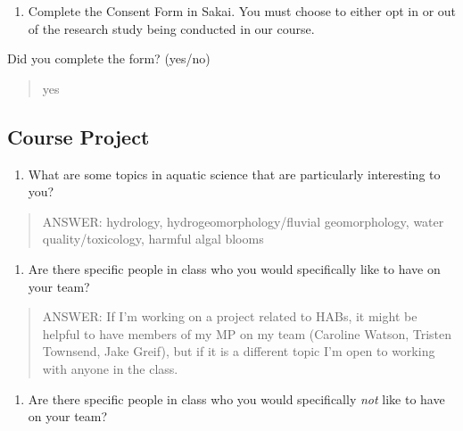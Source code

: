 \documentclass[]{article}
\providecommand{\tightlist}{%
  \setlength{\itemsep}{0pt}\setlength{\parskip}{0pt}}
\begin{document}
\begin{enumerate}
\def\labelenumi{\arabic{enumi}.}
\setcounter{enumi}{1}
\tightlist
\item
  Complete the Consent Form in Sakai. You must choose to either opt in
  or out of the research study being conducted in our course.
\end{enumerate}

Did you complete the form? (yes/no)

\begin{quote}
yes
\end{quote}

\hypertarget{course-project}{%
\subsection{Course Project}\label{course-project}}

\begin{enumerate}
\def\labelenumi{\arabic{enumi}.}
\setcounter{enumi}{2}
\tightlist
\item
  What are some topics in aquatic science that are particularly
  interesting to you?
\end{enumerate}

\begin{quote}
ANSWER: hydrology, hydrogeomorphology/fluvial geomorphology, water
quality/toxicology, harmful algal blooms
\end{quote}

\begin{enumerate}
\def\labelenumi{\arabic{enumi}.}
\setcounter{enumi}{3}
\tightlist
\item
  Are there specific people in class who you would specifically like to
  have on your team?
\end{enumerate}

\begin{quote}
ANSWER: If I'm working on a project related to HABs, it might be helpful
to have members of my MP on my team (Caroline Watson, Tristen Townsend,
Jake Greif), but if it is a different topic I'm open to working with
anyone in the class.
\end{quote}

\begin{enumerate}
\def\labelenumi{\arabic{enumi}.}
\setcounter{enumi}{4}
\tightlist
\item
  Are there specific people in class who you would specifically
  \emph{not} like to have on your team?
\end{enumerate}
\end{document}
